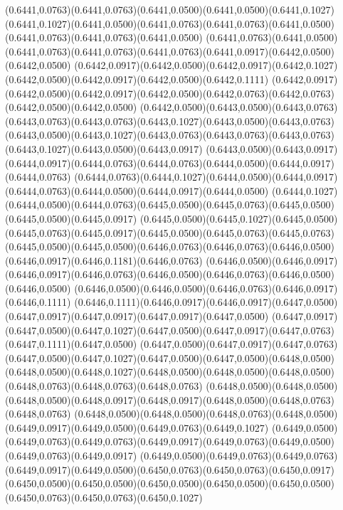 (0.6441,0.0763)(0.6441,0.0763)(0.6441,0.0500)(0.6441,0.0500)(0.6441,0.1027)
\PST@Solid(0.6441,0.1027)(0.6441,0.0500)(0.6441,0.0763)(0.6441,0.0763)(0.6441,0.0500)(0.6441,0.0763)(0.6441,0.0763)(0.6441,0.0500)
(0.6441,0.0763)(0.6441,0.0500)(0.6441,0.0763)(0.6441,0.0763)(0.6441,0.0763)(0.6441,0.0917)(0.6442,0.0500)(0.6442,0.0500)
(0.6442,0.0917)(0.6442,0.0500)(0.6442,0.0917)(0.6442,0.1027)(0.6442,0.0500)(0.6442,0.0917)(0.6442,0.0500)(0.6442,0.1111)
(0.6442,0.0917)(0.6442,0.0500)(0.6442,0.0917)(0.6442,0.0500)(0.6442,0.0763)(0.6442,0.0763)(0.6442,0.0500)(0.6442,0.0500)
(0.6442,0.0500)(0.6443,0.0500)(0.6443,0.0763)(0.6443,0.0763)(0.6443,0.0763)(0.6443,0.1027)(0.6443,0.0500)(0.6443,0.0763)
(0.6443,0.0500)(0.6443,0.1027)(0.6443,0.0763)(0.6443,0.0763)(0.6443,0.0763)(0.6443,0.1027)(0.6443,0.0500)(0.6443,0.0917)
(0.6443,0.0500)(0.6443,0.0917)(0.6444,0.0917)(0.6444,0.0763)(0.6444,0.0763)(0.6444,0.0500)(0.6444,0.0917)(0.6444,0.0763)
(0.6444,0.0763)(0.6444,0.1027)(0.6444,0.0500)(0.6444,0.0917)(0.6444,0.0763)(0.6444,0.0500)(0.6444,0.0917)(0.6444,0.0500)
(0.6444,0.1027)(0.6444,0.0500)(0.6444,0.0763)(0.6445,0.0500)(0.6445,0.0763)(0.6445,0.0500)(0.6445,0.0500)(0.6445,0.0917)
(0.6445,0.0500)(0.6445,0.1027)(0.6445,0.0500)(0.6445,0.0763)(0.6445,0.0917)(0.6445,0.0500)(0.6445,0.0763)(0.6445,0.0763)
(0.6445,0.0500)(0.6445,0.0500)(0.6446,0.0763)(0.6446,0.0763)(0.6446,0.0500)(0.6446,0.0917)(0.6446,0.1181)(0.6446,0.0763)
(0.6446,0.0500)(0.6446,0.0917)(0.6446,0.0917)(0.6446,0.0763)(0.6446,0.0500)(0.6446,0.0763)(0.6446,0.0500)(0.6446,0.0500)
(0.6446,0.0500)(0.6446,0.0500)(0.6446,0.0763)(0.6446,0.0917)(0.6446,0.1111)
\PST@Solid(0.6446,0.1111)(0.6446,0.0917)(0.6446,0.0917)(0.6447,0.0500)(0.6447,0.0917)(0.6447,0.0917)(0.6447,0.0917)(0.6447,0.0500)
(0.6447,0.0917)(0.6447,0.0500)(0.6447,0.1027)(0.6447,0.0500)(0.6447,0.0917)(0.6447,0.0763)(0.6447,0.1111)(0.6447,0.0500)
(0.6447,0.0500)(0.6447,0.0917)(0.6447,0.0763)(0.6447,0.0500)(0.6447,0.1027)(0.6447,0.0500)(0.6447,0.0500)(0.6448,0.0500)
(0.6448,0.0500)(0.6448,0.1027)(0.6448,0.0500)(0.6448,0.0500)(0.6448,0.0500)(0.6448,0.0763)(0.6448,0.0763)(0.6448,0.0763)
(0.6448,0.0500)(0.6448,0.0500)(0.6448,0.0500)(0.6448,0.0917)(0.6448,0.0917)(0.6448,0.0500)(0.6448,0.0763)(0.6448,0.0763)
(0.6448,0.0500)(0.6448,0.0500)(0.6448,0.0763)(0.6448,0.0500)(0.6449,0.0917)(0.6449,0.0500)(0.6449,0.0763)(0.6449,0.1027)
(0.6449,0.0500)(0.6449,0.0763)(0.6449,0.0763)(0.6449,0.0917)(0.6449,0.0763)(0.6449,0.0500)(0.6449,0.0763)(0.6449,0.0917)
(0.6449,0.0500)(0.6449,0.0763)(0.6449,0.0763)(0.6449,0.0917)(0.6449,0.0500)(0.6450,0.0763)(0.6450,0.0763)(0.6450,0.0917)
(0.6450,0.0500)(0.6450,0.0500)(0.6450,0.0500)(0.6450,0.0500)(0.6450,0.0500)(0.6450,0.0763)(0.6450,0.0763)(0.6450,0.1027)
